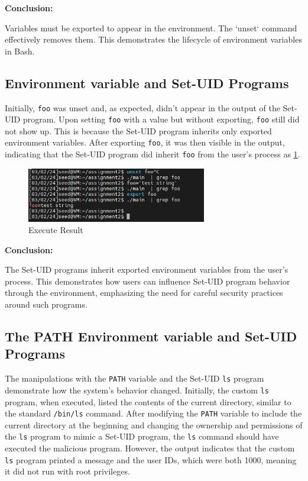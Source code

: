 \documentclass[a4paper,11pt]{article}
\begin{document}
\textbf{Conclusion:}

Variables must be exported to appear in the environment. The `unset` command effectively removes them. This demonstrates the lifecycle of environment variables in Bash.

\subsection{Environment variable and Set-UID Programs}

Initially, \verb|foo| was unset and, as expected, didn't appear in the output of the Set-UID program. Upon setting \verb|foo| with a value but without exporting, \verb|foo| still did not show up. This is because the Set-UID program inherits only exported environment variables. After exporting \verb|foo|, it was then visible in the output, indicating that the Set-UID program did inherit \verb|foo| from the user's process as \ref{fig:task2}. 

\begin{figure}[h]
    \centering
       \includegraphics[width=0.7\textwidth]{figures/task2/task2.png}
    \caption{Execute Result}\label{fig:task2}
\end{figure}

\textbf{Conclusion:}

The Set-UID programs inherit exported environment variables from the user's process. This demonstrates how users can influence Set-UID program behavior through the environment, emphasizing the need for careful security practices around such programs.

\subsection{The PATH Environment variable and Set-UID Programs}

The manipulations with the \verb|PATH| variable and the Set-UID \verb|ls| program demonstrate how the system's behavior changed. Initially, the custom \verb|ls| program, when executed, listed the contents of the current directory, similar to the standard \verb|/bin/ls| command. After modifying the \verb|PATH| variable to include the current directory at the beginning and changing the ownership and permissions of the \verb|ls| program to mimic a Set-UID program, the \verb|ls| command should have executed the malicious program. However, the output indicates that the custom \verb|ls| program printed a message and the user IDs, which were both 1000, meaning it did not run with root privileges.
\end{document}
